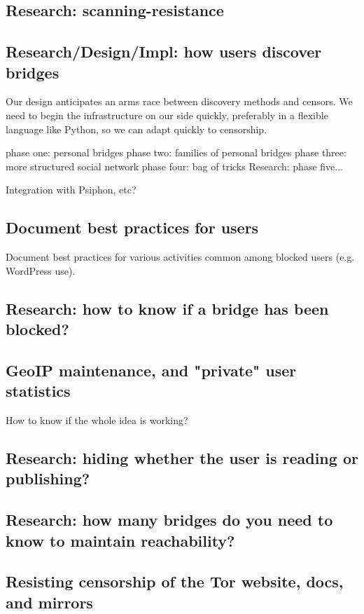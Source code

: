 \documentclass{article}
\begin{document}
\subsection{Research: scanning-resistance}

\subsection{Research/Design/Impl: how users discover bridges}
Our design anticipates an arms race between discovery methods and censors.
We need to begin the infrastructure on our side quickly, preferably in a
flexible language like Python, so we can adapt quickly to censorship.

phase one: personal bridges
phase two: families of personal bridges
phase three: more structured social network
phase four: bag of tricks
Research: phase five...

Integration with Psiphon, etc?

\subsection{Document best practices for users}
Document best practices for various activities common among
blocked users (e.g. WordPress use).

\subsection{Research: how to know if a bridge has been blocked?}

\subsection{GeoIP maintenance, and "private" user statistics}
How to know if the whole idea is working?

\subsection{Research: hiding whether the user is reading or publishing?}

\subsection{Research: how many bridges do you need to know to maintain
reachability?}

\subsection{Resisting censorship of the Tor website, docs, and mirrors}
\end{document}
